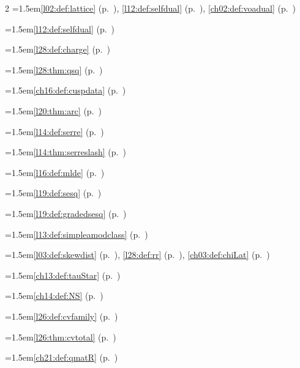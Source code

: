 \begin{multicols}{2}
\hangindent=1.5em\quad \ref{l02:def:lattice} (p.~\pageref{l02:def:lattice}), \ref{l12:def:selfdual} (p.~\pageref{l12:def:selfdual}), \ref{ch02:def:voadual} (p.~\pageref{ch02:def:voadual})\par
\hangindent=1.5em\quad \ref{l12:def:selfdual} (p.~\pageref{l12:def:selfdual})\par
\hangindent=1.5em\quad \ref{l28:def:charge} (p.~\pageref{l28:def:charge})\par
\hangindent=1.5em\quad \ref{l28:thm:qsq} (p.~\pageref{l28:thm:qsq})\par
\hangindent=1.5em\quad \ref{ch16:def:cuspdata} (p.~\pageref{ch16:def:cuspdata})\par
\hangindent=1.5em\quad \ref{l20:thm:arc} (p.~\pageref{l20:thm:arc})\par
\hangindent=1.5em\quad \ref{l14:def:serre} (p.~\pageref{l14:def:serre})\par
\hangindent=1.5em\quad \ref{l14:thm:serreslash} (p.~\pageref{l14:thm:serreslash})\par
\hangindent=1.5em\quad \ref{l16:def:mlde} (p.~\pageref{l16:def:mlde})\par
\hangindent=1.5em\quad \ref{l19:def:sesq} (p.~\pageref{l19:def:sesq})\par
\hangindent=1.5em\quad \ref{l19:def:gradedsesq} (p.~\pageref{l19:def:gradedsesq})\par
\hangindent=1.5em\quad \ref{l13:def:simpleamodclass} (p.~\pageref{l13:def:simpleamodclass})\par
\hangindent=1.5em\quad \ref{l03:def:skewdist} (p.~\pageref{l03:def:skewdist}), \ref{l28:def:rr} (p.~\pageref{l28:def:rr}), \ref{ch03:def:chiLat} (p.~\pageref{ch03:def:chiLat})\par
\hangindent=1.5em\quad \ref{ch13:def:tauStar} (p.~\pageref{ch13:def:tauStar})\par
\hangindent=1.5em\quad \ref{ch14:def:NS} (p.~\pageref{ch14:def:NS})\par
\hangindent=1.5em\quad \ref{l26:def:cvfamily} (p.~\pageref{l26:def:cvfamily})\par
\hangindent=1.5em\quad \ref{l26:thm:cvtotal} (p.~\pageref{l26:thm:cvtotal})\par
\hangindent=1.5em\quad \ref{ch21:def:qmatR} (p.~\pageref{ch21:def:qmatR})\par

\end{multicols}
